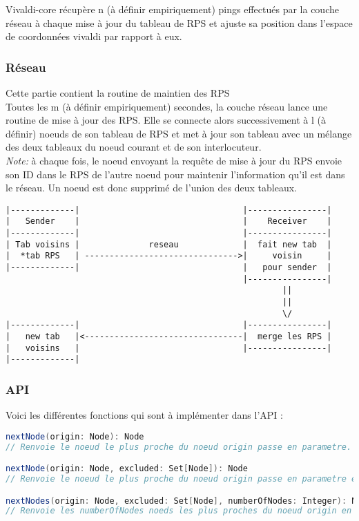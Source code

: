 \documentclass[11pt,a4paper]{article}
\begin{document}
Vivaldi-core récupère n (à définir empiriquement) pings effectués par la couche réseau à chaque mise à jour du tableau de RPS et ajuste sa position dans l’espace de coordonnées vivaldi par rapport à eux.

\subsubsection{Réseau}
Cette partie contient la routine de maintien des RPS\\

Toutes les m (à définir empiriquement) secondes, la couche réseau lance une routine de mise à jour des RPS. Elle se connecte alors successivement à l (à définir) noeuds de son tableau de RPS et met à jour son tableau avec un mélange des deux tableaux du noeud courant et de son interlocuteur. \\

\emph{Note:} à chaque fois, le noeud envoyant la requête de mise à jour du RPS envoie son ID dans le RPS de l’autre noeud pour maintenir l’information qu’il est dans le réseau. Un noeud est donc supprimé de l’union des deux tableaux.\\

\begin{verbatim}
|-------------|                                 |----------------|
|   Sender    |                                 |    Receiver    |
|-------------|                                 |----------------|
| Tab voisins |              reseau             |  fait new tab  |
|  *tab RPS   | ------------------------------->|     voisin     |
|-------------|                                 |   pour sender  |
                                                |----------------|
                                                        ||
                                                        ||
                                                        \/
|-------------|                                 |----------------|
|   new tab   |<--------------------------------|  merge les RPS |
|   voisins   |                                 |----------------|
|-------------|

\end{verbatim}
\subsubsection{API}
Voici les différentes fonctions qui sont à implémenter dans l’API :

\begin{lstlisting}[language=scala]
nextNode(origin: Node): Node
// Renvoie le noeud le plus proche du noeud origin passe en parametre.

nextNode(origin: Node, excluded: Set[Node]): Node
// Renvoie le noeud le plus proche du noeud origin passe en parametre en excluant la liste de noeuds excluded.

nextNodes(origin: Node, excluded: Set[Node], numberOfNodes: Integer): Node
// Renvoie les numberOfNodes noeds les plus proches du noeud origin en exluant la liste de noeuds excluded.
\end{lstlisting}
\end{document}

